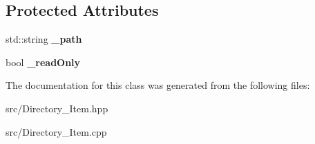 \subsection*{Protected Attributes}
\begin{DoxyCompactItemize}
\item 
\hypertarget{classstb_1_1Directory__Item_a3377772961164f0b0e701e1f15a9d370}{std\+::string {\bfseries \+\_\+path}}\label{classstb_1_1Directory__Item_a3377772961164f0b0e701e1f15a9d370}

\item 
\hypertarget{classstb_1_1Directory__Item_af0e83297a2496cd2b8869ff59dbca578}{bool {\bfseries \+\_\+read\+Only}}\label{classstb_1_1Directory__Item_af0e83297a2496cd2b8869ff59dbca578}

\end{DoxyCompactItemize}


The documentation for this class was generated from the following files\+:\begin{DoxyCompactItemize}
\item 
src/Directory\+\_\+\+Item.\+hpp\item 
src/Directory\+\_\+\+Item.\+cpp\end{DoxyCompactItemize}
